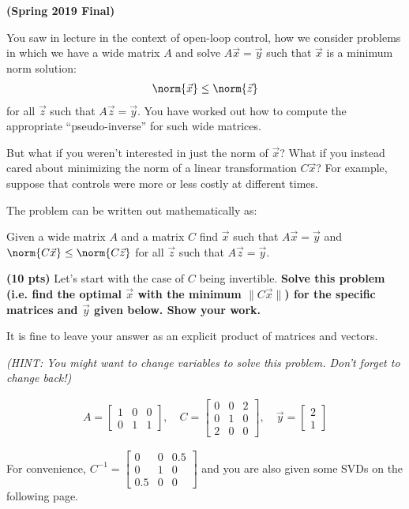  {\bfseries (Spring 2019 Final)}

You saw in lecture in the context of open-loop control, how we
consider problems in which we have a wide
matrix $A$ and solve $A \vec{x} = \vec{y}$ such that $\vec{x}$
is a minimum norm solution:  
\begin{align*}
\norm{\vec{x}} \leq \norm{\vec{z}} 
\end{align*}
for all $\vec{z}$ such that $A \vec{z} = \vec{y}$. You have worked out how to compute the appropriate ``pseudo-inverse'' for
such wide matrices.

But what if you weren't interested in just the norm of $\vec{x}$? What
if you instead cared about minimizing the norm of a linear transformation $C\vec{x}$? For example, suppose that controls were more or less costly
at different times. 

The problem can be written out mathematically as:

Given a wide matrix  $A$ and a matrix $C$ find $\vec{x}$ such that $A \vec{x} = \vec{y}$ and 
$\norm{C\vec{x}} \leq \norm{C\vec{z}} $ for all 
$\vec{z}$ such that $A \vec{z} = \vec{y}$.


{\bf(10 pts)} Let's start with the case of $C$ being invertible. {\bfseries Solve
  this problem (i.e. find the optimal $\vec{x}$ with the minimum $\|C \vec{x}\|$) for the specific
  matrices and $\vec{y}$ given below. Show your work.}

It is fine to leave your answer as an explicit product of
matrices and vectors.

{\em (HINT: You might want to change variables to solve this
  problem. Don't forget to change back!)} 

\begin{align*}
A = \begin{bmatrix}
1 & 0 & 0 \\
0& 1 & 1
\end{bmatrix}, \quad
C = \begin{bmatrix}
0 & 0 & 2\\
0 & 1 & 0 \\
2 & 0 & 0
\end{bmatrix}, \quad 
\vec{y} = \begin{bmatrix}
2 \\
1
\end{bmatrix}
\end{align*}

For convenience, $C^{-1} = \begin{bmatrix}
0 & 0 & 0.5\\
0 & 1 & 0 \\
0.5 & 0 & 0
\end{bmatrix}$ and you are also given some SVDs on the following page.

